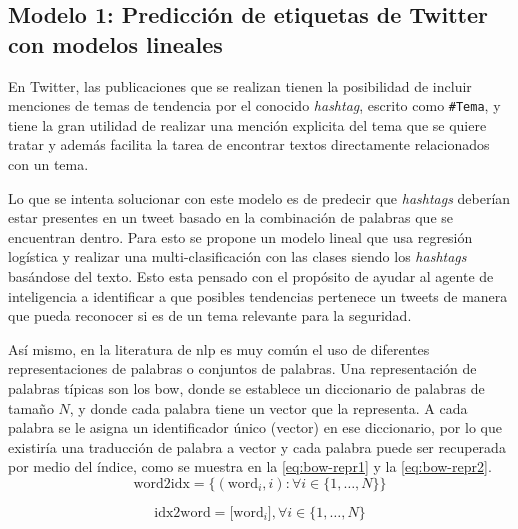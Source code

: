 \subsection{Modelo 1: Predicción de etiquetas de Twitter con modelos lineales} \label{sec:twitter-prediction}
En Twitter, las publicaciones que se realizan tienen la posibilidad de incluir menciones de temas de tendencia por el conocido \emph{hashtag}, escrito como \texttt{\#Tema}, y tiene la gran utilidad de realizar una mención explicita del tema que se quiere tratar y además facilita la tarea de encontrar textos directamente relacionados con un tema.


Lo que se intenta solucionar con este modelo es de predecir que \emph{hashtags} deberían estar presentes en un tweet basado en la combinación de palabras que se encuentran dentro. Para esto se propone un modelo lineal que usa regresión logística y realizar una multi-clasificación con las clases siendo los \emph{hashtags} basándose del texto. Esto esta pensado con el propósito de ayudar al agente de inteligencia a identificar a que posibles tendencias pertenece un tweets de manera que pueda reconocer si es de un tema relevante para la seguridad.

Así mismo, en la literatura de \gls{nlp} es muy común el uso de diferentes representaciones de palabras o conjuntos de palabras. Una representación de palabras típicas son los \gls{bow}, donde se establece un diccionario de palabras de tamaño $N$, y donde cada palabra tiene un vector que la representa. A cada palabra se le asigna un identificador único (vector) en ese diccionario, por lo que existiría una traducción de palabra a vector y cada palabra puede ser recuperada por medio del índice, como se muestra en la \cref{eq:bow-repr1} y la \cref{eq:bow-repr2}.
\begin{equation} \label{eq:bow-repr1}
  \text{word2idx} = \Big\{(\text{word}_i, i) : \forall i \in \{1, \ldots, N\} \Big\}
\end{equation}

\begin{equation} \label{eq:bow-repr2}
  \text{idx2word} = \Big[\text{word}_i\Big], \forall i \in \{1, \ldots, N\}
\end{equation}

